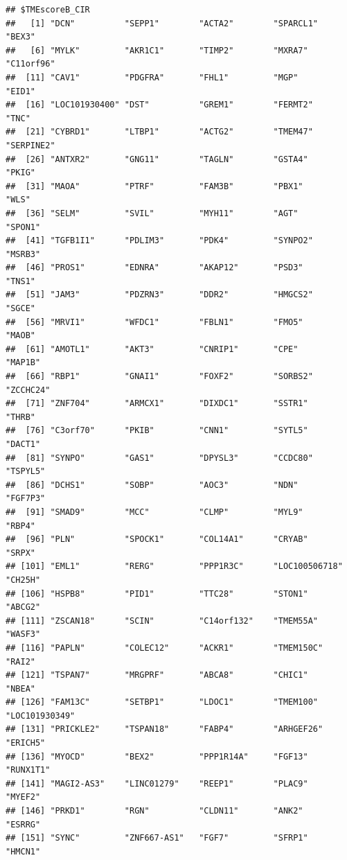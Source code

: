 \documentclass[
  12pt,
]{book}
\theoremstyle{definition}
\theoremstyle{definition}
\theoremstyle{definition}
\theoremstyle{definition}
\theoremstyle{remark}
\begin{document}
\begin{verbatim}
## $TMEscoreB_CIR
##   [1] "DCN"          "SEPP1"        "ACTA2"        "SPARCL1"      "BEX3"        
##   [6] "MYLK"         "AKR1C1"       "TIMP2"        "MXRA7"        "C11orf96"    
##  [11] "CAV1"         "PDGFRA"       "FHL1"         "MGP"          "EID1"        
##  [16] "LOC101930400" "DST"          "GREM1"        "FERMT2"       "TNC"         
##  [21] "CYBRD1"       "LTBP1"        "ACTG2"        "TMEM47"       "SERPINE2"    
##  [26] "ANTXR2"       "GNG11"        "TAGLN"        "GSTA4"        "PKIG"        
##  [31] "MAOA"         "PTRF"         "FAM3B"        "PBX1"         "WLS"         
##  [36] "SELM"         "SVIL"         "MYH11"        "AGT"          "SPON1"       
##  [41] "TGFB1I1"      "PDLIM3"       "PDK4"         "SYNPO2"       "MSRB3"       
##  [46] "PROS1"        "EDNRA"        "AKAP12"       "PSD3"         "TNS1"        
##  [51] "JAM3"         "PDZRN3"       "DDR2"         "HMGCS2"       "SGCE"        
##  [56] "MRVI1"        "WFDC1"        "FBLN1"        "FMO5"         "MAOB"        
##  [61] "AMOTL1"       "AKT3"         "CNRIP1"       "CPE"          "MAP1B"       
##  [66] "RBP1"         "GNAI1"        "FOXF2"        "SORBS2"       "ZCCHC24"     
##  [71] "ZNF704"       "ARMCX1"       "DIXDC1"       "SSTR1"        "THRB"        
##  [76] "C3orf70"      "PKIB"         "CNN1"         "SYTL5"        "DACT1"       
##  [81] "SYNPO"        "GAS1"         "DPYSL3"       "CCDC80"       "TSPYL5"      
##  [86] "DCHS1"        "SOBP"         "AOC3"         "NDN"          "FGF7P3"      
##  [91] "SMAD9"        "MCC"          "CLMP"         "MYL9"         "RBP4"        
##  [96] "PLN"          "SPOCK1"       "COL14A1"      "CRYAB"        "SRPX"        
## [101] "EML1"         "RERG"         "PPP1R3C"      "LOC100506718" "CH25H"       
## [106] "HSPB8"        "PID1"         "TTC28"        "STON1"        "ABCG2"       
## [111] "ZSCAN18"      "SCIN"         "C14orf132"    "TMEM55A"      "WASF3"       
## [116] "PAPLN"        "COLEC12"      "ACKR1"        "TMEM150C"     "RAI2"        
## [121] "TSPAN7"       "MRGPRF"       "ABCA8"        "CHIC1"        "NBEA"        
## [126] "FAM13C"       "SETBP1"       "LDOC1"        "TMEM100"      "LOC101930349"
## [131] "PRICKLE2"     "TSPAN18"      "FABP4"        "ARHGEF26"     "ERICH5"      
## [136] "MYOCD"        "BEX2"         "PPP1R14A"     "FGF13"        "RUNX1T1"     
## [141] "MAGI2-AS3"    "LINC01279"    "REEP1"        "PLAC9"        "MYEF2"       
## [146] "PRKD1"        "RGN"          "CLDN11"       "ANK2"         "ESRRG"       
## [151] "SYNC"         "ZNF667-AS1"   "FGF7"         "SFRP1"        "HMCN1"       

\end{verbatim}
\end{document}
